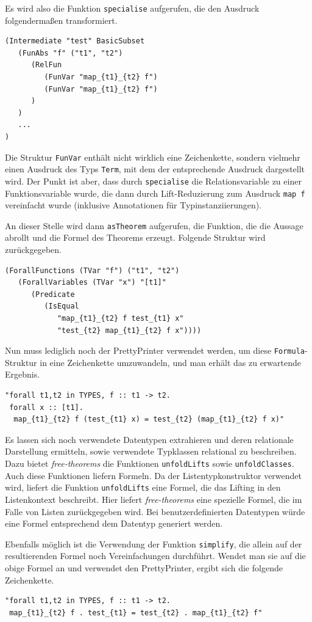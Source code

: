 Es wird also die Funktion \texttt{specialise} aufgerufen, die den Ausdruck folgendermaßen transformiert.

\begin{verbatim}
(Intermediate "test" BasicSubset 
   (FunAbs "f" ("t1", "t2")
      (RelFun
         (FunVar "map_{t1}_{t2} f")
         (FunVar "map_{t1}_{t2} f")
      )
   )
   ...
)
\end{verbatim}

Die Struktur \texttt{FunVar} enthält nicht wirklich eine Zeichenkette, sondern vielmehr einen Ausdruck des Typs \texttt{Term},
mit dem der entsprechende Ausdruck dargestellt wird. Der Punkt ist aber, dass durch \texttt{specialise} die Relationsvariable
zu einer Funktionsvariable wurde, die dann durch Lift-Reduzierung zum Ausdruck \texttt{map f} vereinfacht wurde (inklusive
Annotationen für Typinstanziierungen).

An dieser Stelle wird dann \texttt{asTheorem} aufgerufen, die Funktion, die die Aussage abrollt und die Formel des Theorems
erzeugt. Folgende Struktur wird zurückgegeben.

\begin{verbatim}
(ForallFunctions (TVar "f") ("t1", "t2")
   (ForallVariables (TVar "x") "[t1]"
      (Predicate
         (IsEqual
            "map_{t1}_{t2} f test_{t1} x"
            "test_{t2} map_{t1}_{t2} f x"))))
\end{verbatim}

Nun muss lediglich noch der PrettyPrinter verwendet werden, um diese \texttt{Formula}-Struktur in eine Zeichenkette umzuwandeln,
und man erhält das zu erwartende Ergebnis.

\begin{verbatim}
"forall t1,t2 in TYPES, f :: t1 -> t2.
 forall x :: [t1].
  map_{t1}_{t2} f (test_{t1} x) = test_{t2} (map_{t1}_{t2} f x)"
\end{verbatim}

Es lassen sich noch verwendete Datentypen extrahieren und deren relationale Darstellung ermitteln, sowie verwendete Typklassen
relational zu beschreiben. Dazu bietet \textit{free-theorems} die Funktionen \texttt{unfoldLifts} sowie \texttt{unfoldClasses}.
Auch diese Funktionen liefern Formeln. %
Da der Listentypkonstruktor verwendet wird, liefert die Funktion \texttt{unfoldLifts} eine Formel, die das Lifting in den Listenkontext
beschreibt. Hier liefert \textit{free-theorems} eine spezielle Formel, die im Falle von Listen zurückgegeben wird. Bei benutzerdefinierten
Datentypen würde eine Formel entsprechend dem Datentyp generiert werden.

Ebenfalls möglich ist die Verwendung der Funktion \texttt{simplify}, die allein auf der resultierenden Formel noch Vereinfachungen
durchführt. Wendet man sie auf die obige Formel an und verwendet den PrettyPrinter, ergibt sich die folgende
Zeichenkette.

\begin{verbatim}
"forall t1,t2 in TYPES, f :: t1 -> t2.
 map_{t1}_{t2} f . test_{t1} = test_{t2} . map_{t1}_{t2} f"
\end{verbatim}